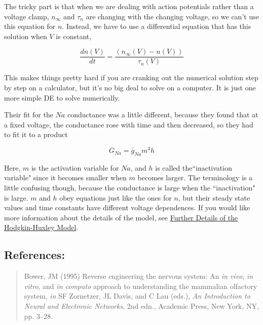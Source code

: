 \documentclass[12pt]{article}
\begin{document}
The tricky part is that when we are dealing with action potentials rather than a voltage clamp, $n_\infty$ and $\tau_n$ are changing with the changing voltage, so we can't use this equation for $n$. Instead, we have to use a differential equation that has this solution when $V$ is constant,

\begin{equation}
		\frac{dn(V)}{dt} = \frac{(n_\infty(V) - n(V))}{\tau_n(V)}
\label{eq:eq4}	
\end{equation}

This makes things pretty hard if you are cranking out the numerical solution step by step on a calculator, but it's no big deal to solve on a computer. It is just one more simple DE to solve numerically.

Their fit for the $Na$ conductance was a little different, because they found that at a fixed voltage, the conductance rose with time and then decreased, so they had to fit it to a product

\begin{equation}
		G_{Na} = \bar{g}_{Na}m^{3}h
\label{eq:eq5}		
\end{equation}

Here, $m$ is the activation variable for $Na$, and $h$ is called the``inactivation variable" since it becomes smaller when $m$ becomes larger. The terminology is a little confusing though, because the conductance is large when the ``inactivation" is large. $m$ and $h$ obey equations just like the ones for $n$, but their steady state values and time constants have different voltage dependences. If you would like more information about the details of the model, see \href{../hh-model-details/hh-model-details.pdf}{Further Details of the Hodgkin-Huxley Model}.

\subsection*{References:}

\begin{quote}

Bower, JM (1995) Reverse engineering the nervous system: An {\it in vivo}, {\it in vitro}, and {\it in computo} approach to understanding the mammalian olfactory system, {\it in} SF Zornetzer, JL Davis, and C Lau (eds.), {\it An Introduction to Neural and Electronic Networks}, 2nd edn., Academic Press, New York, NY, pp. 3--28.

\end{quote}
\end{document}
